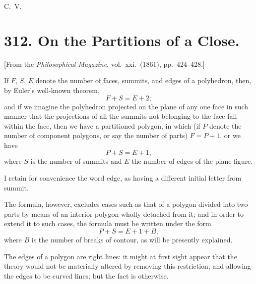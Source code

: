 \documentclass[11pt,a4paper]{article}
\theoremstyle{plain}
\begin{document}
\medskip
\noindent C.\ V.


\newpage
\section*{312. On the Partitions of a Close.}

[From the \textit{Philosophical Magazine}, vol.\ xxi.\ (1861), pp.\ 424--428.]

\medskip

If $F$, $S$, $E$ denote the number of faces, summits, and edges of a polyhedron, then, by Euler's well-known theorem,
\[
F + S = E + 2;
\]
and if we imagine the polyhedron projected on the plane of any one face in such manner that the projections of all the summits not belonging to the face fall within the face, then we have a partitioned polygon, in which (if $P$ denote the number of component polygons, or say the number of parts) $F = P + 1$, or we have
\[
P + S = E + 1,
\]
where $S$ is the number of summits and $E$ the number of edges of the plane figure.

I retain for convenience the word edge, as having a different initial letter from summit.

The formula, however, excludes cases such as that of a polygon divided into two parts by means of an interior polygon wholly detached from it; and in order to extend it to such cases, the formula must be written under the form
\[
P + S = E + 1 + B,
\]
where $B$ is the number of breaks of contour, as will be presently explained.

The edges of a polygon are right lines: it might at first sight appear that the theory would not be materially altered by removing this restriction, and allowing the edges to be curved lines; but the fact is otherwise.
\end{document}
